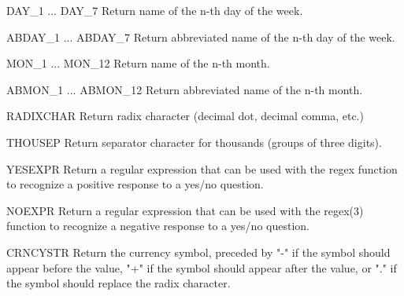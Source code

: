 \begin{datadesc}{DAY_1 ... DAY_7}
Return name of the n-th day of the week. 
\end{datadesc}

\begin{datadesc}{ABDAY_1 ... ABDAY_7}
Return abbreviated name of the n-th day of the week.
\end{datadesc}

\begin{datadesc}{MON_1 ... MON_12}
Return name of the n-th month.
\end{datadesc}

\begin{datadesc}{ABMON_1 ... ABMON_12}
Return abbreviated name of the n-th month.
\end{datadesc}

\begin{datadesc}{RADIXCHAR}
Return radix character (decimal dot, decimal comma, etc.)
\end{datadesc}

\begin{datadesc}{THOUSEP}
Return separator character for thousands (groups of three digits).
\end{datadesc}

\begin{datadesc}{YESEXPR}
Return a regular expression that can be used with the regex
function to recognize a positive response to a yes/no question.
\end{datadesc}

\begin{datadesc}{NOEXPR}
Return a regular expression that can be used with the regex(3)
function to recognize a negative response to a yes/no question.
\end{datadesc}

\begin{datadesc}{CRNCYSTR}
Return the currency symbol, preceded by "-" if the symbol should
appear before the value, "+" if the symbol should appear after the
value, or "." if the symbol should replace the radix character.
\end{datadesc}

